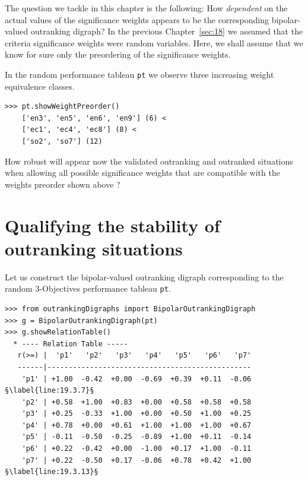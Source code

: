 The question we tackle in this chapter is the following: How \emph{dependent} on the actual values of the significance weights appears to be the corresponding bipolar-valued outranking digraph? In the previous Chapter~\ref{sec:18} we assumed that the criteria significance weights were random variables. Here, we shall assume that we know for sure only the preordering of the significance weights.

In the random performance tableau \texttt{pt} we observe three increasing weight equivalence classes.
\begin{lstlisting}[caption={The significance weights preorder},label=list:19.2]
>>> pt.showWeightPreorder()
    ['en3', 'en5', 'en6', 'en9'] (6) <
    ['ec1', 'ec4', 'ec8'] (8) <
    ['so2', 'so7'] (12)
\end{lstlisting}

How robust will appear now the validated outranking and outranked situations when allowing all possible significance weights that are compatible with the weights preorder shown above \citep*{BIS-2009,BIS-2014Robust}?

\section{Qualifying the stability of outranking situations}
\label{sec:19.2}

Let us construct the bipolar-valued outranking digraph corresponding to the random 3-Objectives performance tableau \texttt{pt}.
\begin{lstlisting}[caption={Example Bipolar Outranking Digraph},label=list:19.3]
>>> from outrankingDigraphs import BipolarOutrankingDigraph
>>> g = BipolarOutrankingDigraph(pt)
>>> g.showRelationTable()
  * ---- Relation Table -----
   r(>=) |  'p1'   'p2'   'p3'   'p4'   'p5'   'p6'   'p7'   
   ------|------------------------------------------------
    'p1' | +1.00  -0.42  +0.00  -0.69  +0.39  +0.11  -0.06  §\label{line:19.3.7}§
    'p2' | +0.58  +1.00  +0.83  +0.00  +0.58  +0.58  +0.58  
    'p3' | +0.25  -0.33  +1.00  +0.00  +0.50  +1.00  +0.25  
    'p4' | +0.78  +0.00  +0.61  +1.00  +1.00  +1.00  +0.67  
    'p5' | -0.11  -0.50  -0.25  -0.89  +1.00  +0.11  -0.14  
    'p6' | +0.22  -0.42  +0.00  -1.00  +0.17  +1.00  -0.11  
    'p7' | +0.22  -0.50  +0.17  -0.06  +0.78  +0.42  +1.00  §\label{line:19.3.13}§
\end{lstlisting}

